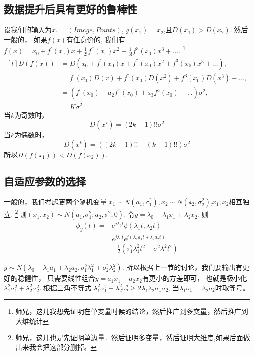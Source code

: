 \documentclass{amsart}
\begin{document}
\subsection{数据提升后具有更好的鲁棒性}
  设我们的输入为$x_1=(Image,Points)$,
  $g(x_1)=x_2$,且$D(x_1)>D(x_2)$.
  然后一般的，
  如果$f(x)$有任意价的,
  我们有$f(x)=x_0+f^{'}(x_0)x+\frac{1}{2!}f^{''}(x_0)x^2+\frac{1}{3!}f^{3}(x_0)x^3+\dots$.
  \footnote{师兄，这儿我想先证明在单变量时候的结论，然后推广到多变量，然后推广到大维统计}
    \begin{equation}
    \label{eq:05}
    \begin{aligned}[t]
      D(f(x)) & =D(x_0+f^{'}(x_0)x+f^{''}(x_0)x^2+f^{3}(x_0)x^3+\dots),\\
      &= f^{'}(x_0)D(x)+f^{''}(x_0)D(x^2)+f^3(x_0)D(x^3)+\dots,\\
      &=(f^{'}(x_0)+a_2f^{''}(x_0)+a_3f^3(x_0)+\dots)\sigma^2,\\
      &=K\sigma^2
    \end{aligned}
  \end{equation}
  当$k$为奇数时，
  \begin{equation}
    \label{eq:06}
    D(x^k)=(2k-1)!! \sigma^2
  \end{equation}
  当$k$为偶数时，
    \begin{equation}
    \label{eq:07}
    D(x^k)=((2k-1)!!-(k-1)!!) \sigma^2
  \end{equation}
  所以$D(f(x_1))<D(f(x_2))$.
  \subsection{自适应参数的选择}
  一般的，我们考虑更两个随机变量
  $x_1 \sim N(a_1,\sigma_1^2),x_2 \sim N(a_2,\sigma_2^2)$,$x_1,x_2$相互独立.
  \footnote{师兄，这儿也是先证明单边量，然后证明多变量，然后证明大维度,如果后面做出来我会把这部分删掉。}
  则$(x_1,x_2) \sim N(a_1,\sigma_1^2;a_2,\sigma^2;0)$.
  令$y=\lambda_0+\lambda_1 x_1 +\lambda_2 x_2$.
  则
  \begin{equation}
    \label{eq:01}
        \begin{aligned}
      \phi_y(t)=&e^{j\lambda_0 t}\phi(\lambda_1t,\lambda_2 t)\\
      =&e^{j\lambda_0 t}e^{j(\lambda_1a_1t +\lambda_2a_2t)}\\
      &-\frac{1}{2}(\sigma_1^2\lambda_1^2t^2+\sigma^2\lambda^2t^2)
    \end{aligned}
  \end{equation}

  \( y\sim N(\lambda_0+\lambda_1a_1+\lambda_2a_2,\sigma_1^2\lambda_1^2+\sigma_2^2\lambda_2^2)\).
  所以根据上一节的讨论，我们要输出有更好的稳健性，
  只需要线性组合$y=a_1x_1+a_2x_2$有更小的方差即可，
  也就是极小化$\lambda_1^2\sigma_1^2+\lambda_2^2\sigma_2^2$.
  根据三角不等式
  $\lambda_1^2\sigma_1^2+\lambda_2^2\sigma_2^2 \geqslant 2\lambda_1\lambda_2\sigma_1\sigma_2$,
  当$\lambda_1\sigma_1=\lambda_2\sigma_2$时取等号。
\end{document}
